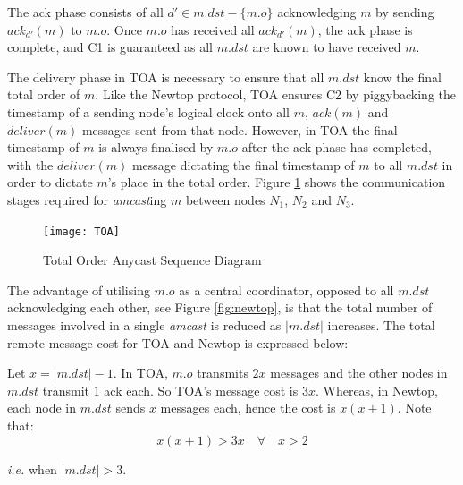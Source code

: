 			The ack phase consists of all $d' \in m.dst-\{m.o\}$ acknowledging $m$ by sending $ack_{d'}(m)$ to $m.o$.  Once $m.o$ has received all $ack_{d'}(m)$, the ack phase is complete, and C1 is guaranteed as all $m.dst$ are known to have received $m$.  
			
			The delivery phase in TOA is necessary to ensure that all $m.dst$ know the final total order of $m$. Like the Newtop protocol, TOA ensures C2 by piggybacking the timestamp of a sending node's logical clock onto all $m$, $ack(m)$ and $deliver(m)$ messages sent from that node.  However, in TOA the final timestamp of $m$ is always finalised by $m.o$ after the ack phase has completed, with the $deliver(m)$ message dictating the final timestamp of $m$ to all $m.dst$ in order to dictate $m$'s place in the total order.  Figure \ref{fig:TOA} shows the communication stages required for \emph{amcast}ing $m$ between nodes $N_1$, $N_2$ and $N_3$.  
			
            \begin{figure}[htbp!] 
                \centering    
                \texttt{[image: TOA]}
                \caption[Total Order Anycast Protocol]{Total Order Anycast Sequence Diagram}
                \label{fig:TOA}
            \end{figure}	 			
			
			The advantage of utilising $m.o$ as a central coordinator, opposed to all $m.dst$ acknowledging each other, see Figure \ref{fig:newtop}, is that the total number of messages involved in a single \emph{amcast} is reduced as $\left\vert m.dst \right\vert$ increases.  The total remote message cost for TOA and Newtop is expressed below:
            
			
			\begin{samepage}
                Let $x = |m.dst| -1$.  In TOA, $m.o$ transmits $2x$ messages and the other nodes in $m.dst$ transmit $1$ ack each.  So TOA's message cost is $3x$.  Whereas, in Newtop, each node in $m.dst$ sends $x$ messages each, hence the cost is $x(x+1)$.  Note that:
				\begin{equation*}
				x (x + 1) > 3x \quad \forall \quad x > 2
			    \end{equation*}
			    
			     \emph{i.e.} when $|m.dst| > 3$.
            \end{samepage}
            
